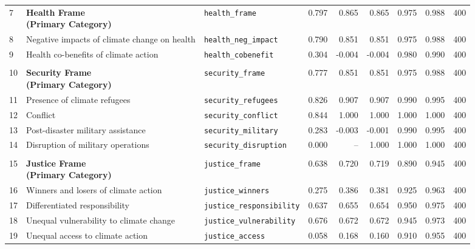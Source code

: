 \begin{longtable}{p{0.5cm}p{4.4cm}p{3.0cm}rrrrrr}
\midrule
\rowcolor{gray!8}
\multicolumn{9}{l}{\textit{Health Frame}} \\
\midrule
7 & \textbf{Health Frame\newline (Primary Category)} & \texttt{health\_frame} & 0.797 & 0.865 & 0.865 & 0.975 & 0.988 & 400 \\
\cmidrule(lr){1-9}
8 & Negative impacts of climate change on health & \texttt{health\_neg\_impact} & 0.790 & 0.851 & 0.851 & 0.975 & 0.988 & 400 \\
9 & Health co-benefits of climate action & \texttt{health\_cobenefit} & 0.304 & -0.004 & -0.004 & 0.980 & 0.990 & 400 \\
\midrule
\rowcolor{gray!8}
\multicolumn{9}{l}{\textit{Security Frame}} \\
\midrule
10 & \textbf{Security Frame\newline (Primary Category)} & \texttt{security\_frame} & 0.777 & 0.851 & 0.851 & 0.975 & 0.988 & 400 \\
\cmidrule(lr){1-9}
11 & Presence of climate refugees & \texttt{security\_refugees} & 0.826 & 0.907 & 0.907 & 0.990 & 0.995 & 400 \\
12 & Conflict & \texttt{security\_conflict} & 0.844 & 1.000 & 1.000 & 1.000 & 1.000 & 400 \\
13 & Post-disaster military assistance & \texttt{security\_military} & 0.283 & -0.003 & -0.001 & 0.990 & 0.995 & 400 \\
14 & Disruption of military operations & \texttt{security\_disruption} & 0.000 & -- & 1.000 & 1.000 & 1.000 & 400 \\
\midrule
\rowcolor{gray!8}
\multicolumn{9}{l}{\textit{Justice Frame}} \\
\midrule
15 & \textbf{Justice Frame\newline (Primary Category)} & \texttt{justice\_frame} & 0.638 & 0.720 & 0.719 & 0.890 & 0.945 & 400 \\
\cmidrule(lr){1-9}
16 & Winners and losers of climate action & \texttt{justice\_winners} & 0.275 & 0.386 & 0.381 & 0.925 & 0.963 & 400 \\
17 & Differentiated responsibility & \texttt{justice\_responsibility} & 0.637 & 0.655 & 0.654 & 0.950 & 0.975 & 400 \\
18 & Unequal vulnerability to climate change & \texttt{justice\_vulnerability} & 0.676 & 0.672 & 0.672 & 0.945 & 0.973 & 400 \\
19 & Unequal access to climate action & \texttt{justice\_access} & 0.058 & 0.168 & 0.160 & 0.910 & 0.955 & 400 \\

\end{longtable}
